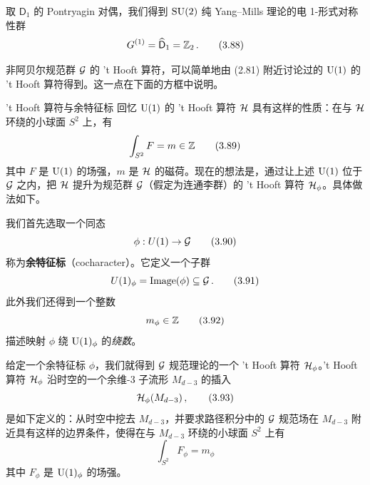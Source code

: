 
 取 $\mathsf{D}_1$ 的 Pontryagin 对偶，我们得到 $\mathrm{SU}(2)$ 纯 Yang--Mills 理论的电 1-形式对称性群
\begin{equation}
  G^{(1)}=\widehat{\mathsf{D}}_1=\mathbb{Z}_2\,. \tag{3.88}
\end{equation}

 非阿贝尔规范群 $\mathcal{G}$ 的 't Hooft 算符，可以简单地由 (2.81) 附近讨论过的 $\mathrm{U}(1)$ 的 't Hooft 算符得到。这一点在下面的方框中说明。

\begin{notebox}{'t Hooft 算符与余特征标}
回忆 $\mathrm{U}(1)$ 的 't Hooft 算符 $\mathcal{H}$ 具有这样的性质：在与 $\mathcal{H}$ 环绕的小球面 $S^2$ 上，有
\begin{equation}
  \int_{S^2}F=m\in\mathbb{Z} \tag{3.89}
\end{equation}
其中 $F$ 是 $\mathrm{U}(1)$ 的场强，$m$ 是 $\mathcal{H}$ 的磁荷。现在的想法是，通过让上述 $\mathrm{U}(1)$ 位于 $\mathcal{G}$ 之内，把 $\mathcal{H}$ 提升为规范群 $\mathcal{G}$（假定为连通李群）的 't Hooft 算符 $\mathcal{H}_\phi$。具体做法如下。

我们首先选取一个同态
\begin{equation}
  \phi : U(1)\to\mathcal{G} \tag{3.90}
\end{equation}
称为\textbf{余特征标}（cocharacter）。它定义一个子群
\begin{equation}
  U(1)_\phi=\mathrm{Image}(\phi)\subseteq\mathcal{G}\,. \tag{3.91}
\end{equation}
此外我们还得到一个整数
\begin{equation}
  m_\phi\in\mathbb{Z} \tag{3.92}
\end{equation}
描述映射 $\phi$ 绕 $\mathrm{U}(1)_\phi$ 的\emph{绕数}。

给定一个余特征标 $\phi$，我们就得到 $\mathcal{G}$ 规范理论的一个 't Hooft 算符 $\mathcal{H}_\phi$。't Hooft 算符 $\mathcal{H}_\phi$ 沿时空的一个余维-3 子流形 $M_{d-3}$ 的插入
\begin{equation}
  \mathcal{H}_\phi(M_{d-3})\,, \tag{3.93}
\end{equation}
是如下定义的：从时空中挖去 $M_{d-3}$，并要求路径积分中的 $\mathcal{G}$ 规范场在 $M_{d-3}$ 附近具有这样的边界条件，使得在与 $M_{d-3}$ 环绕的小球面 $S^2$ 上有
\begin{equation}
  \int_{S^2}F_\phi=m_\phi \tag{3.94}
\end{equation}
其中 $F_\phi$ 是 $\mathrm{U}(1)_\phi$ 的场强。
\end{notebox}

